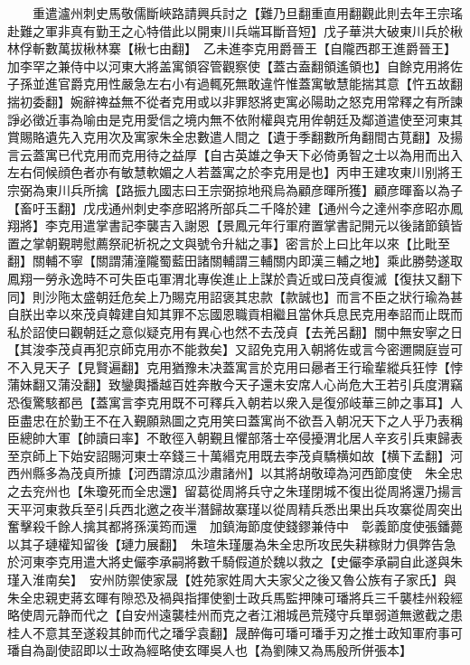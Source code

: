 　　重遣瀘州刺史馬敬儒斷峽路請興兵討之【難乃旦翻重直用翻觀此則去年王宗瑤赴難之軍非真有勤王之心特借此以開東川兵端耳斷音短】戊子華洪大破東川兵於楸林俘斬數萬拔楸林寨【楸七由翻】　乙未進李克用爵晉王【自隴西郡王進爵晉王】加李罕之兼侍中以河東大將盖寓領容管觀察使【蓋古盍翻領遙領也】自餘克用將佐子孫並進官爵克用性嚴急左右小有過輒死無敢違忤惟蓋寓敏慧能揣其意【忤五故翻揣初委翻】婉辭禆益無不從者克用或以非罪怒將吏寓必陽助之怒克用常釋之有所諫諍必徵近事為喻由是克用愛信之境内無不依附權與克用侔朝廷及鄰道遣使至河東其賞賜賂遺先入克用次及寓家朱全忠數遣人間之【遺于季翻數所角翻間古莧翻】及揚言云蓋寓已代克用而克用待之益厚【自古英雄之争天下必倚勇智之士以為用而出入左右伺候顔色者亦有敏慧軟媚之人若蓋寓之於李克用是也】丙申王建攻東川别將王宗弼為東川兵所擒【路振九國志曰王宗弼掠地飛烏為顧彦暉所獲】顧彦暉畜以為子【畜吁玉翻】戊戌通州刺史李彦昭將所部兵二千降於建【通州今之達州李彦昭亦鳳翔將】李克用遣掌書記李襲吉入謝恩【景鳳元年行軍府置掌書記開元以後諸節鎮皆置之掌朝覲聘慰薦祭祀祈祝之文與號令升絀之事】密言於上曰比年以來【比毗至翻】關輔不寧【關謂蒲潼隴蜀藍田諸關輔謂三輔關内即漢三輔之地】乘此勝勢遂取鳳翔一勞永逸時不可失臣屯軍渭北專俟進止上謀於貴近或曰茂貞復滅【復扶又翻下同】則沙陁太盛朝廷危矣上乃賜克用詔褒其忠款【款誠也】而言不臣之狀行瑜為甚自朕出幸以來茂貞韓建自知其罪不忘國恩職貢相繼且當休兵息民克用奉詔而止既而私於詔使曰觀朝廷之意似疑克用有異心也然不去茂貞【去羌呂翻】關中無安寧之日【其浚李茂貞再犯京師克用亦不能救矣】又詔免克用入朝將佐或言今密邇闕庭豈可不入見天子【見賢遍翻】克用猶豫未决蓋寓言於克用曰曏者王行瑜輩縱兵狂悖【悖蒲妹翻又蒲没翻】致鑾輿播越百姓奔散今天子還未安席人心尚危大王若引兵度渭竊恐復驚駭都邑【蓋寓言李克用既不可釋兵入朝若以衆入是復邠岐華三帥之事耳】人臣盡忠在於勤王不在入覲願熟圖之克用笑曰蓋寓尚不欲吾入朝况天下之人乎乃表稱臣總帥大軍【帥讀曰率】不敢徑入朝覲且懼部落士卒侵擾渭北居人辛亥引兵東歸表至京師上下始安詔賜河東士卒錢三十萬緡克用既去李茂貞驕横如故【横下孟翻】河西州縣多為茂貞所據【河西謂涼瓜沙肅諸州】以其將胡敬璋為河西節度使　朱全忠之去兖州也【朱瓊死而全忠還】留葛從周將兵守之朱瑾閉城不復出從周將還乃揚言天平河東救兵至引兵西北邀之夜半潛歸故寨瑾以從周精兵悉出果出兵攻寨從周突出奮擊殺千餘人擒其都將孫漢筠而還　加鎮海節度使錢鏐兼侍中　彰義節度使張鐇薨以其子璉權知留後【璉力展翻】　朱瑄朱瑾屢為朱全忠所攻民失耕稼財力俱弊告急於河東李克用遣大將史儼李承嗣將數千騎假道於魏以救之【史儼李承嗣自此遂與朱瑾入淮南矣】　安州防禦使家晟【姓苑家姓周大夫家父之後又魯公族有子家氏】與朱全忠親吏蔣玄暉有隙恐及禍與指揮使劉士政兵馬監押陳可璠將兵三千襲桂州殺經略使周元静而代之【自安州遠襲桂州而克之者江湘城邑荒殘守兵單弱道無邀截之患桂人不意其至遂殺其帥而代之璠孚袁翻】晟醉侮可璠可璠手刃之推士政知軍府事可璠自為副使詔即以士政為經略使玄暉吳人也【為劉陳又為馬殷所併張本】

